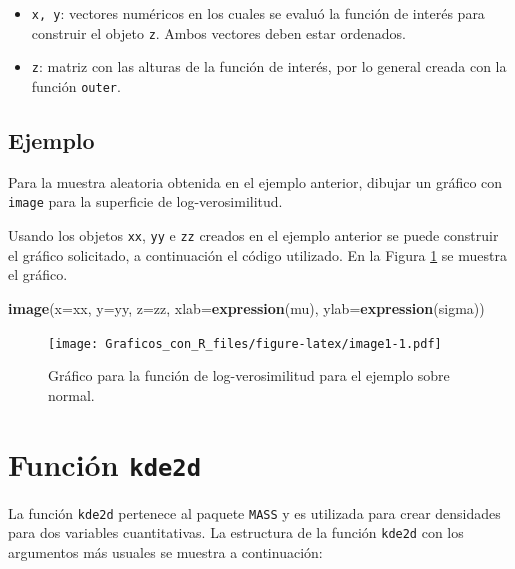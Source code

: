 \documentclass[10pt,]{krantz}
\makeatletter
\newenvironment{Shaded}{\begin{snugshade}}{\end{snugshade}}
\newcommand{\KeywordTok}[1]{\textcolor[rgb]{0.13,0.29,0.53}{\textbf{#1}}}
\newcommand{\DataTypeTok}[1]{\textcolor[rgb]{0.13,0.29,0.53}{#1}}
\newcommand{\NormalTok}[1]{#1}
\providecommand{\tightlist}{%
  \setlength{\itemsep}{0pt}\setlength{\parskip}{0pt}}
\newenvironment{kframe}{%
\medskip{}
\setlength{\fboxsep}{.8em}
 \def\at@end@of@kframe{}%
 \ifinner\ifhmode%
  \def\at@end@of@kframe{\end{minipage}}%
  \begin{minipage}{\columnwidth}%
 \fi\fi%
 \def\FrameCommand##1{\hskip\@totalleftmargin \hskip-\fboxsep
 \colorbox{shadecolor}{##1}\hskip-\fboxsep
     \hskip-\linewidth \hskip-\@totalleftmargin \hskip\columnwidth}%
 \MakeFramed {\advance\hsize-\width
   \@totalleftmargin\z@ \linewidth\hsize
   \@setminipage}}%
 {\par\unskip\endMakeFramed%
 \at@end@of@kframe}
\renewenvironment{Shaded}{\begin{kframe}}{\end{kframe}}
\makeatother
\begin{document}
\begin{itemize}
\tightlist
\item
  \texttt{x,\ y}: vectores numéricos en los cuales se evaluó la función
  de interés para construir el objeto \texttt{z}. Ambos vectores deben
  estar ordenados.
\item
  \texttt{z}: matriz con las alturas de la función de interés, por lo
  general creada con la función \texttt{outer}.
\end{itemize}

\subsection*{Ejemplo}\label{ejemplo-24}


Para la muestra aleatoria obtenida en el ejemplo anterior, dibujar un
gráfico con \texttt{image} para la superficie de log-verosimilitud.

Usando los objetos \texttt{xx}, \texttt{yy} e \texttt{zz} creados en el
ejemplo anterior se puede construir el gráfico solicitado, a
continuación el código utilizado. En la Figura \ref{fig:image1} se
muestra el gráfico.

\begin{Shaded}
\begin{Highlighting}[]
\KeywordTok{image}\NormalTok{(}\DataTypeTok{x=}\NormalTok{xx, }\DataTypeTok{y=}\NormalTok{yy, }\DataTypeTok{z=}\NormalTok{zz,}
      \DataTypeTok{xlab=}\KeywordTok{expression}\NormalTok{(mu), }\DataTypeTok{ylab=}\KeywordTok{expression}\NormalTok{(sigma))}
\end{Highlighting}
\end{Shaded}

\begin{figure}
\centering
\texttt{[image: Graficos\_con\_R\_files/figure-latex/image1-1.pdf]}
\caption{\label{fig:image1}Gráfico para la función de log-verosimilitud para
el ejemplo sobre normal.}
\end{figure}

\section{\texorpdfstring{Función \texttt{kde2d} 
}{Función kde2d  }}\label{funcion-kde2d}

La función \texttt{kde2d} pertenece al paquete \texttt{MASS} y es
utilizada para crear densidades para dos variables cuantitativas. La
estructura de la función \texttt{kde2d} con los argumentos más usuales
se muestra a continuación:
\end{document}
